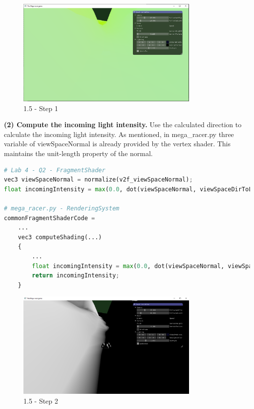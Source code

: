 \documentclass[a4 paper, 12pt]{article}
\begin{document}
    \begin{figure} [H]
        \centering
        \includegraphics[width=0.8\textwidth, frame]
            {./images/mega_racer/1.5_a.PNG}
        \caption{1.5 - Step 1}
    \end{figure}

\textbf{(2) Compute the incoming light intensity.}
Use the calculated direction to calculate the incoming light intensity. As mentioned, in mega\_racer.py three variable of viewSpaceNormal is already provided by the vertex shader. This maintains the unit-length property of the normal.
    \begin{lstlisting}[language=python] 
# Lab 4 - Q2 - FragmentShader
vec3 viewSpaceNormal = normalize(v2f_viewSpaceNormal);
float incomingIntensity = max(0.0, dot(viewSpaceNormal, viewSpaceDirToLight));

# mega_racer.py - RenderingSystem
commonFragmentShaderCode =
    ...
    vec3 computeShading(...)
    {
        ...
        float incomingIntensity = max(0.0, dot(viewSpaceNormal, viewSpaceDirToLight));
        return incomingIntensity;
    }
    \end{lstlisting}

    \begin{figure} [H]
        \centering
        \includegraphics[width=0.8\textwidth, frame]
            {./images/mega_racer/1.5_b.PNG}
        \caption{1.5 - Step 2}
    \end{figure}
\end{document}
